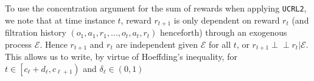 \documentclass{article} %
\newcommand{\indep}{\perp \!\!\! \perp}
\begin{document}
To use the concentration argument for the sum of rewards when applying \texttt{UCRL2}, we note that at time instance $t$, reward $r_{t+1}$ is only dependent on reward $r_t$ (and filtration history $(o_1, a_1, r_1, ..., o_t, a_t, r_t)$ henceforth) through an exogenous process $\mathcal{E}$. Hence $r_{t+1}$ and $r_t$ are independent given $\mathcal{E}$ for all $t$, or $r_{t+1} \indep r_t | \mathcal{E}$. This allows us to write, by virtue of Hoeffding's inequality, for $t \in \left[c_\ell+d_{\ell}, c_{\ell+1}\right)$ and $\delta_{\ell} \in (0, 1)$ 




\end{document}
